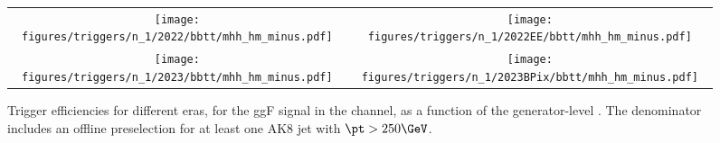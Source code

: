 
    \begin{figure}[H]
        \centering
        \begin{tabular}{cc}
            \texttt{[image: figures/triggers/n\_1/2022/bbtt/mhh\_hm\_minus.pdf]} &
            \texttt{[image: figures/triggers/n\_1/2022EE/bbtt/mhh\_hm\_minus.pdf]} \\[1ex]
            \texttt{[image: figures/triggers/n\_1/2023/bbtt/mhh\_hm\_minus.pdf]} &
            \texttt{[image: figures/triggers/n\_1/2023BPix/bbtt/mhh\_hm\_minus.pdf]}
            \label{fig}
        \end{tabular}
\caption{Trigger efficiencies for different eras, for the ggF \HHbbtt signal in the \tauhm channel, as a function of the generator-level \mHH. The denominator includes an offline preselection for at least one AK8 jet with $\pt > 250\GeV$.}
\label{fig:triggers_n-1_bbtt_hm_mhh}
\end{figure}
